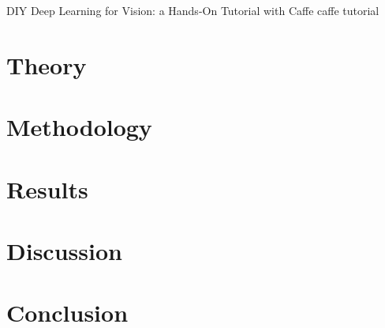 \documentclass[a4paper,12pt]{article}
\begin{document}
DIY Deep Learning for Vision: a Hands-On Tutorial with Caffe
caffe tutorial

\section{Theory}

\section{Methodology}

\section{Results}

\section{Discussion}

\section{Conclusion}
\end{document}
